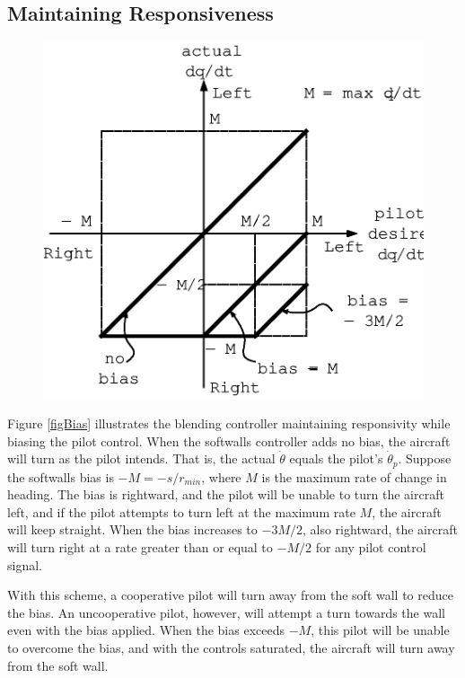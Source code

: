 \documentclass[11pt]{article}
\begin{document}
\subsection{Maintaining Responsiveness}

\begin{figure}[btp]
\centering
\includegraphics{bias.eps}
\end{figure}

Figure \ref{figBias} illustrates the blending controller maintaining
responsivity while biasing the pilot control.  When the softwalls
controller adds no bias, the aircraft will turn as the pilot
intends. That is, the actual $\dot{\theta}$ equals the pilot's
$\dot{\theta}_{p}$.  Suppose the softwalls bias is $-M = -s/r_{min}$,
where $M$ is the maximum rate of change in heading.  The bias is
rightward, and the pilot will be unable to turn the aircraft left, and
if the pilot attempts to turn left at the maximum rate $M$, the
aircraft will keep straight.  When the bias increases to $-3M/2$, also
rightward, the aircraft will turn right at a rate greater than or
equal to $-M/2$ for any pilot control signal.

With this scheme, a cooperative pilot will turn away from the soft
wall to reduce the bias.  An uncooperative pilot, however, will
attempt a turn towards the wall even with the bias applied.  When the
bias exceeds $-M$, this pilot will be unable to overcome the bias, and
with the controls saturated, the aircraft will turn away from the soft
wall.
\end{document}
